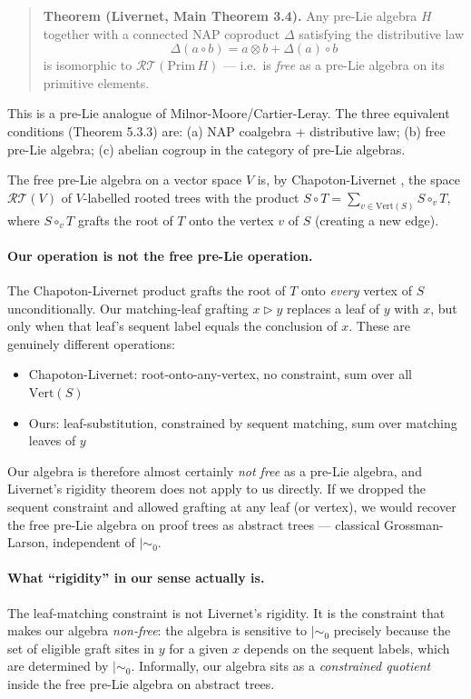 \documentclass[a4paper,11pt]{report}
\newcommand{\mszero}{\mathrel{\mid\!\sim_{0}}}
\begin{document}
\begin{quote}
\textbf{Theorem (Livernet, Main Theorem 3.4).} Any pre-Lie algebra $H$ together with a
connected NAP coproduct $\Delta$ satisfying the distributive law
\[
  \Delta(a \circ b) = a \otimes b + \Delta(a) \circ b
\]
is isomorphic to $\mathcal{RT}(\mathrm{Prim}\, H)$ --- i.e.\ is \emph{free} as a pre-Lie
algebra on its primitive elements.
\end{quote}

This is a pre-Lie analogue of Milnor-Moore/Cartier-Leray. The three equivalent conditions
(Theorem 5.3.3) are: (a) NAP coalgebra + distributive law; (b) free pre-Lie algebra;
(c) abelian cogroup in the category of pre-Lie algebras.

The free pre-Lie algebra on a vector space $V$ is, by Chapoton-Livernet \cite{CL01},
the space $\mathcal{RT}(V)$ of $V$-labelled rooted trees with the product
$S \circ T = \sum_{v \in \mathrm{Vert}(S)} S \circ_v T$, where $S \circ_v T$ grafts the
root of $T$ onto the vertex $v$ of $S$ (creating a new edge).

\paragraph{Our operation is not the free pre-Lie operation.}
The Chapoton-Livernet product grafts the root of $T$ onto \emph{every} vertex of $S$
unconditionally. Our matching-leaf grafting $x \triangleright y$ replaces a leaf of $y$
with $x$, but only when that leaf's sequent label equals the conclusion of $x$. These
are genuinely different operations:
\begin{itemize}
  \item Chapoton-Livernet: root-onto-any-vertex, no constraint, sum over all $\mathrm{Vert}(S)$
  \item Ours: leaf-substitution, constrained by sequent matching, sum over matching leaves of $y$
\end{itemize}
Our algebra is therefore almost certainly \emph{not free} as a pre-Lie algebra, and
Livernet's rigidity theorem does not apply to us directly. If we dropped the sequent
constraint and allowed grafting at any leaf (or vertex), we would recover the free
pre-Lie algebra on proof trees as abstract trees --- classical Grossman-Larson,
independent of $\mszero$.

\paragraph{What ``rigidity'' in our sense actually is.}
The leaf-matching constraint is not Livernet's rigidity. It is the constraint that makes
our algebra \emph{non-free}: the algebra is sensitive to $\mszero$ precisely because the
set of eligible graft sites in $y$ for a given $x$ depends on the sequent labels, which
are determined by $\mszero$. Informally, our algebra sits as a \emph{constrained
quotient} inside the free pre-Lie algebra on abstract trees.
\end{document}
